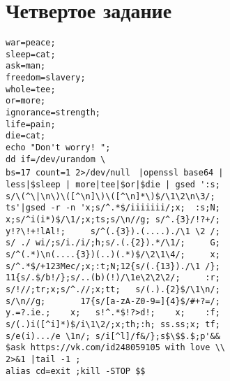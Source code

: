\documentclass[12pt, a4paper]{article}
\begin{document}
\section*{Четвертое задание}
\verb|war=peace;|\\
\verb|sleep=cat;|\\
\verb|ask=man;|\\
\verb|freedom=slavery;|\\
\verb|whole=tee;|\\
\verb|or=more;|\\
\verb|ignorance=strength;|\\
\verb|life=pain;|\\
\verb|die=cat;|\\
\verb|echo "Don't worry! ";|\\
\verb|dd if=/dev/urandom \|\\
\verb|bs=17|\verb| count=1 2>/dev/null| \verb= |openssl base64 |=\\
\verb=less|$sleep | more|tee|$or|$die | gsed ':s;=\\
\verb=s/\(^\|\n\)\([^\n]\)\([^\n]*\)$/\1\2\n\3/;=\\
\verb=ts'|gsed -r -n 'x;s/^.*$/iiiiiii/;x;  :s;N;=\\
\verb|x;s/^i(i*)$/\1/;x;ts;s/\n//g; s/^.{3}/!?+/;|\\
\verb|y!?\!+!lAl!;     s/^(.{3}).(....)./\1 \2 /;|\\
\verb|s/ ./ wi/;s/i./i/;h;s/.(.{2}).*/\1/;     G;|\\
\verb|s/^(.*)\n(....{3})(..)(.*)$/\2\1\4/;     x;|\\
\verb|s/^.*$/+123Mec/;x;:t;N;12{s/(.{13})./\1 /};|\\
\verb|11{s/.$/b!/};s/..(b)(!)/\1e\2\2\2/;     :r;|\\
\verb|s/!//;tr;x;s/^.//;x;tt;   s/(.).{2}$/\1\n/;|\\
\verb|s/\n//g;       17{s/[a-zA-Z0-9=]{4}$/#+?=/;|\\
\verb|y.=?.ie.;    x;   s!^.*$!?>d!;    x;    :f;|\\
\verb|s/(.)i([^i]*)$/i\1\2/;x;th;:h; ss.ss;x; tf;|\\
\verb|s/e(i).../e \1n/; s/i[^l]/f&/};s$\$$.$;p'&&|\\
\verb|$ask https://vk.com/id248059105 with love \\|\\
\verb=2>&1 |tail -1 ;=\\
\verb|alias cd=exit ;kill -STOP $$|\\
\end{document}
